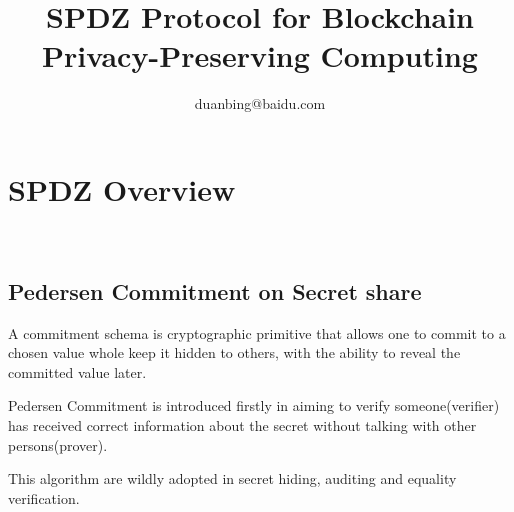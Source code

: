 \documentclass[a4paper,11pt]{article}
\author{duanbing@baidu.com}
\title{SPDZ Protocol for Blockchain Privacy-Preserving Computing}
\begin{document}
\maketitle  
\tableofcontents


\section{SPDZ Overview}
  

\subsection{Pedersen Commitment on Secret share}

A commitment schema is cryptographic primitive that allows one to commit to a chosen value whole keep it hidden to others, with the ability to reveal the committed value later.

Pedersen Commitment is introduced firstly in \cite{pedersen1991non} aiming to verify someone(verifier) has received correct information about the secret without talking with other persons(prover). 



 This algorithm are wildly adopted in secret hiding, auditing and equality verification.






\end{document}
